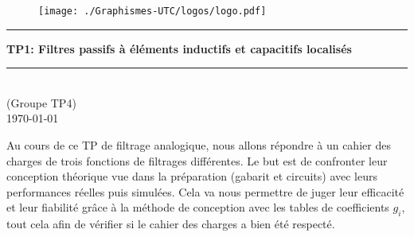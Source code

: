 \thispagestyle{empty} %
\setcounter{page}{0} %

\begin{figure}[H]
\centering
\texttt{[image: ./Graphismes-UTC/logos/logo.pdf]}
\end{figure}

\vspace{3cm}

\begin{center}

{\color{orange}\rule{\linewidth}{0.8mm}}
\vspace*{0mm}

\Huge{\textbf{TP1: Filtres passifs à éléments
inductifs et capacitifs localisés}}
{\color{orange}\rule{\linewidth}{0.8mm}}

\vspace{0.5cm}
\Large{\theauthor} \\
\small{(Groupe TP4)}\\
\Large{\today}
\end{center}
 
\vspace{3cm}

\begin{myabstract}
Au cours de ce TP de filtrage analogique, nous allons répondre à un cahier des charges de trois fonctions de filtrages différentes. 
Le but est de confronter leur conception théorique vue dans la préparation (gabarit et circuits) avec leurs performances réelles puis simulées.
Cela va nous permettre de juger leur efficacité et leur fiabilité grâce à la méthode de conception avec les tables de coefficients $g_i$, tout cela afin de vérifier si le cahier des charges a bien été respecté.
\end{myabstract}

\clearpage
